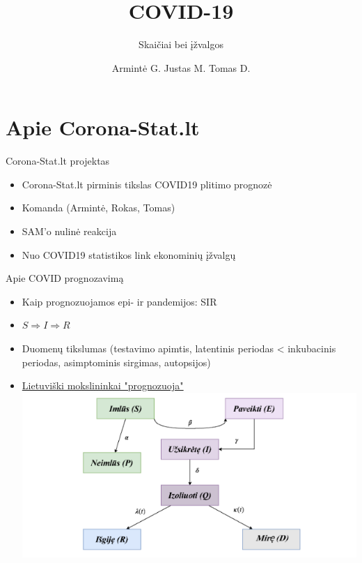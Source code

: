 \documentclass[11pt]{beamer}
\author{Armintė G. Justas M. Tomas D.}
\title{COVID-19}
\subtitle{Skaičiai bei įžvalgos}
\begin{document}
\begin{frame}
\titlepage
\end{frame}

\begin{frame}
\tableofcontents
\end{frame}

\section{Apie Corona-Stat.lt}
\begin{frame}{Corona-Stat.lt projektas}
\begin{itemize}
\item Corona-Stat.lt pirminis tikslas COVID19 plitimo prognozė
\item Komanda (Armintė, Rokas, Tomas)
\item SAM'o nulinė reakcija
\item Nuo COVID19 statistikos link ekonominių įžvalgų
\end{itemize}
\end{frame}


\begin{frame}{Apie COVID prognozavimą}
\begin{itemize}
\item Kaip prognozuojamos epi- ir pandemijos: SIR
\item $S \Longrightarrow I \Longrightarrow R$
\item Duomenų tikslumas (testavimo apimtis, latentinis periodas < inkubacinis periodas, asimptominis sirgimas, autopsijos)
\item \href{https://mif.vu.lt/lt3/dokumentai/dokumentai/Naujienos/COVID/2020-04-15_SEIR_ilgalakes_prognozes.pdf}{Lietuviški mokslininkai "prognozuoja"}
\includegraphics[scale=0.4]{seiqrdp.png}

\end{itemize}
\end{frame}
\end{document}
